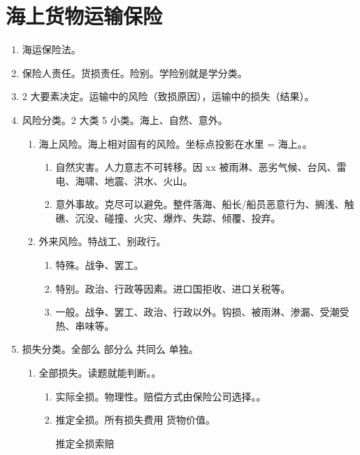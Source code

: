 \section{海上货物运输保险}
\begin{enumerate}
  \item 海运保险法。
  \item 保险人责任。货损责任。险别。学险别就是学分类。
  \item 2 大要素决定。运输中的风险（致损原因），运输中的损失（结果）。
  \item 风险分类。2 大类 5 小类。海上、自然、意外。
        \begin{enumerate}
          \item 海上风险。海上相对固有的风险。坐标点投影在水里 = 海上。。
                \begin{enumerate}
                  \item 自然灾害。人力意志不可转移。因 xx 被雨淋、恶劣气候、台风、雷电、海啸、地震、洪水、火山。
                  \item 意外事故。克尽可以避免。整件落海、船长/船员恶意行为、搁浅、触礁、沉没、碰撞、火灾、爆炸、失踪、倾覆、投弃。
                \end{enumerate}
          \item 外来风险。特战工、别政行。
                \begin{enumerate}
                  \item 特殊。战争、罢工。
                  \item 特别。政治、行政等因素。进口国拒收、进口关税等。
                  \item 一般。战争、罢工、政治、行政以外。钩损、被雨淋、渗漏、受潮受热、串味等。
                \end{enumerate}
        \end{enumerate}
  \item 损失分类。全部么 \yjt 部分么 \yjt 共同么 \yjt 单独。
        \begin{enumerate}
          \item 全部损失。读题就能判断。。
                \begin{enumerate}
                  \item 实际全损。物理性。赔偿方式由保险公司选择。。
                  \item 推定全损。所有损失费用 \dy 货物价值。
                        \begin{kk}{推定全损索赔}
                          \begin{enumerate}

\end{enumerate}
\end{kk}
\end{enumerate}
\end{enumerate}
\end{enumerate}
